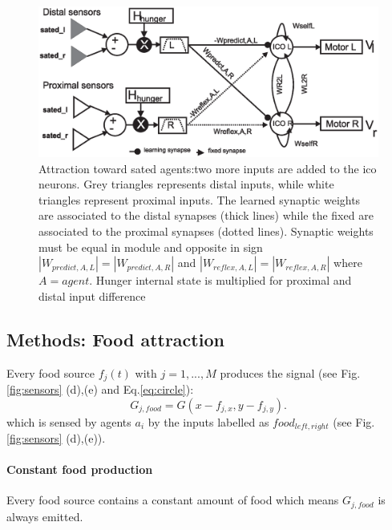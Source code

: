 \begin{figure}[htb]
\includegraphics[scale=0.4]{figures/socialadapt/attractionAgent.eps}
\small{
\caption[Attractive behaviour for other agents]{
Attraction toward sated agents:two more inputs are added to the ico neurons.
Grey triangles represents distal inputs, while white triangles represent
proximal inputs. The learned synaptic weights are associated to the distal
synapses (thick lines) while the fixed are associated to the proximal
synapses (dotted lines). Synaptic weights must be equal in module and
opposite in sign $|W_{predict,A,L}|=|W_{predict,A,R}|$ and
$|W_{reflex,A,L}|=|W_{reflex,A,R}|$  where $A=agent$.
Hunger internal state is multiplied for proximal and distal
input difference \label{fig:attractionAgent}}
}

\end{figure}


\subsection{Methods: Food attraction}
Every food source $f_{j}(t)$ with $j=1,...,M$ produces the signal
(see Fig.\ref{fig:sensors} (d),(e) and Eq.\ref{eq:circle}):
\begin{equation}
G_{j,food}=G(x-f_{j,x},y-f_{j,y}).
\label{eq:food}
\end{equation}
which is sensed by agents $a_{i}$ by the inputs labelled as
$food_{left,right}$ (see Fig.\ref{fig:sensors} (d),(e)).
\paragraph{Constant food production}
Every food source contains a constant amount of food which means $G_{j,food}$
is always emitted.
